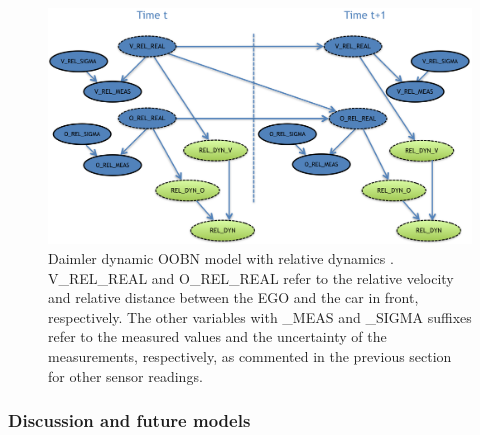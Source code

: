 \begin{figure}[ht!]
\begin{center}
\includegraphics[scale=0.48]{./figures/Daimlerreldyn.png}
\end{center}
\caption{\label{Figure:daimlerreldyn}Daimler dynamic OOBN model with relative dynamics \cite{SlavaThesis2014}. V\_REL\_REAL and O\_REL\_REAL refer to the relative velocity and relative distance between the EGO and the car in front, respectively. The other variables with \_MEAS and \_SIGMA suffixes refer to the measured values and the uncertainty of the measurements, respectively, as commented in the previous section for other sensor readings.}
\end{figure}


%
%
%

\subsubsection{Discussion and future models}\label{subsubsection:daimlerfuture}

